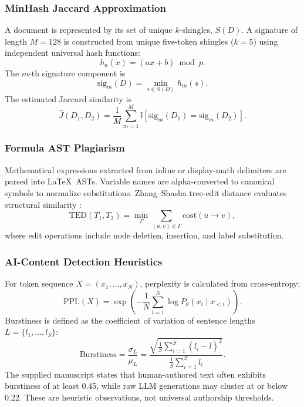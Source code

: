 \documentclass[conference]{IEEEtran}
\begin{document}
\subsubsection{MinHash Jaccard Approximation}
A document is represented by its set of unique $k$-shingles, $S(D)$. A signature of length $M=128$ is constructed from unique five-token shingles ($k=5$) using independent universal hash functions:
\begin{equation}
h_a(x)=(a x+b)\bmod p.
\label{eq:universal}
\end{equation}
The $m$-th signature component is
\begin{equation}
\mathrm{sig}_m(D)=\min_{s\in S(D)}h_m(s).
\label{eq:minhash}
\end{equation}
The estimated Jaccard similarity is
\begin{equation}
\widehat{J}(D_1,D_2)=
\frac{1}{M}\sum_{m=1}^{M}
\mathbb{I}\left[
\mathrm{sig}_m(D_1)=\mathrm{sig}_m(D_2)
\right].
\label{eq:jaccard}
\end{equation}
\subsubsection{Formula AST Plagiarism}
Mathematical expressions extracted from inline or display-math delimiters are parsed into \LaTeX\ ASTs. Variable names are alpha-converted to canonical symbols to normalize substitutions. Zhang--Shasha tree-edit distance evaluates structural similarity \cite{zhang1989tree}:
\begin{equation}
\mathrm{TED}(T_1,T_2)=
\min_{\Gamma}\sum_{(u,v)\in\Gamma}
\mathrm{cost}(u\rightarrow v),
\label{eq:ted}
\end{equation}
where edit operations include node deletion, insertion, and label substitution.
\subsubsection{AI-Content Detection Heuristics}
For token sequence $X=(x_1,\ldots,x_N)$, perplexity is calculated from cross-entropy:
\begin{equation}
\mathrm{PPL}(X)=
\exp\left(
-\frac{1}{N}\sum_{i=1}^{N}
\log P_{\theta}(x_i\mid x_{<i})
\right).
\label{eq:ppl}
\end{equation}
Burstiness is defined as the coefficient of variation of sentence lengths
$L=\{l_1,\ldots,l_S\}$:
\begin{equation}
\mathrm{Burstiness}=
\frac{\sigma_L}{\mu_L}
=
\frac{
\sqrt{\frac{1}{S}\sum_{i=1}^{S}(l_i-\bar l)^2}
}{
\frac{1}{S}\sum_{i=1}^{S}l_i
}.
\label{eq:burst}
\end{equation}
The supplied manuscript states that human-authored text often exhibits burstiness of at least 0.45, while raw LLM generations may cluster at or below 0.22. These are heuristic observations, not universal authorship thresholds.
\end{document}
